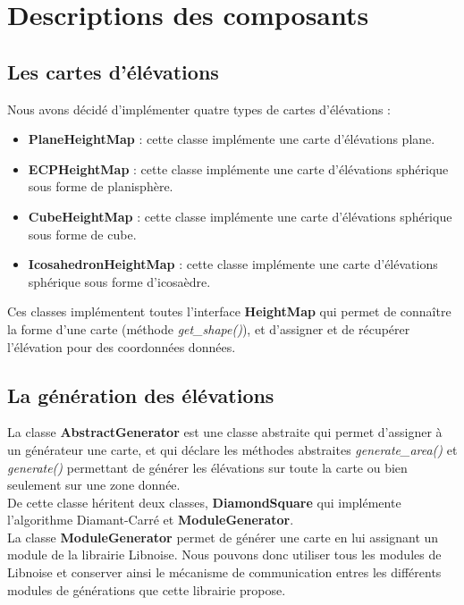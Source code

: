 \chapter{Descriptions des composants}

\section{Les cartes d'élévations}

Nous avons décidé d'implémenter quatre types de cartes d'élévations :\\

\begin{itemize}
\item \textbf{PlaneHeightMap} : cette classe implémente une carte d'élévations plane.
\item \textbf{ECPHeightMap} : cette classe implémente une carte d'élévations sphérique
sous forme de planisphère.
\item \textbf{CubeHeightMap} : cette classe implémente une carte d'élévations sphérique
sous forme de cube.
\item \textbf{IcosahedronHeightMap} : cette classe implémente une carte d'élévations
sphérique sous forme d'icosaèdre.\\
\end{itemize}

Ces classes implémentent toutes l'interface \textbf{HeightMap} qui permet de
connaître la forme d'une carte (méthode \emph{get\_shape()}), et d'assigner et de
récupérer l'élévation pour des coordonnées données.

\section{La génération des élévations}
La classe \textbf{AbstractGenerator} est une classe abstraite qui permet
d'assigner à un générateur une carte, et qui déclare les méthodes abstraites
\emph{generate\_area()} et \emph{generate()} permettant de générer les
élévations sur toute la carte ou bien seulement sur une zone donnée.\\

De cette classe héritent deux classes, \textbf{DiamondSquare} qui implémente
l'algorithme Diamant-Carré et \textbf{ModuleGenerator}.\\

La classe \textbf{ModuleGenerator} permet de générer une carte en lui assignant
un module de la librairie Libnoise. Nous pouvons donc utiliser tous les modules
de Libnoise et conserver ainsi le mécanisme de communication entres les
différents modules de générations que cette librairie propose.\\

